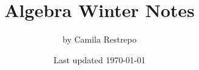 \documentclass{notes}
\title{\bfseries Algebra Winter Notes}
\author{by Camila Restrepo}
\date{Last updated \today}
\begin{document}
\maketitle
\toccontents
\frontpagewarning



\end{document}
